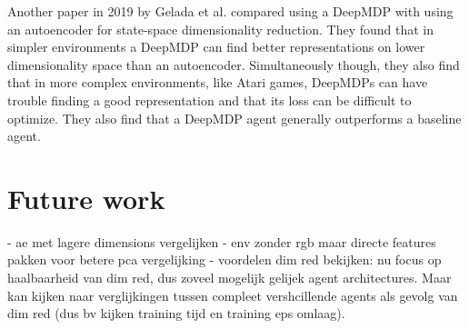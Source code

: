Another paper in 2019 by Gelada et al. \cite{deepmdp} compared using a DeepMDP with using an autoencoder for state-space dimensionality reduction. They found that in simpler environments a DeepMDP can find better representations on lower dimensionality space than an autoencoder. Simultaneously though, they also find that in more complex environments, like Atari games, DeepMDPs can have trouble finding a good representation and that its loss can be difficult to optimize. They also find that a DeepMDP agent generally outperforms a baseline agent. 


\chapter{Future work}\label{futurework}
- ae met lagere dimensions vergelijken
- env zonder rgb maar directe features pakken voor betere pca vergelijking
- voordelen dim red bekijken: nu focus op haalbaarheid van dim red, dus zoveel mogelijk gelijek agent architectures. Maar kan kijken naar verglijkingen tussen compleet vershcillende agents als gevolg van dim red (dus bv kijken training tijd en training eps omlaag).

